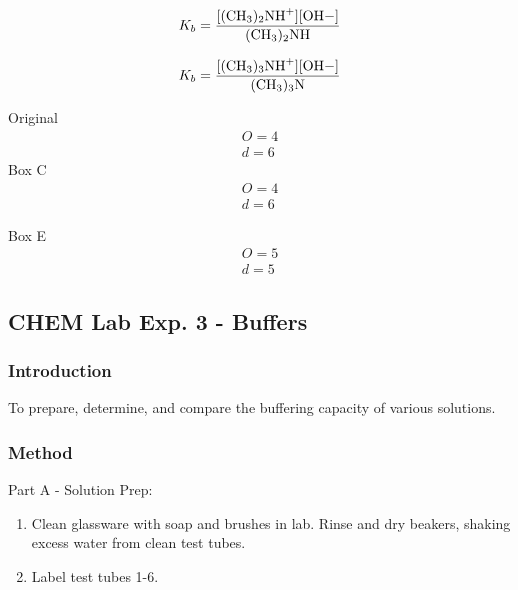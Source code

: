 \documentclass{article}  %
\begin{document}
\begin{equation*}
    \begin{aligned}
        K_b = \ce{\frac{[(CH3)2NH^+][OH-]}{(CH3)2NH}}
    \end{aligned}
\end{equation*}

\begin{equation*}
    \begin{aligned}
        K_b = \ce{\frac{[(CH3)3NH+][OH-]}{(CH3)3N}}
    \end{aligned}
\end{equation*}

Original
\begin{equation*}
    \begin{aligned}
        O = 4 \\
        d = 6 
    \end{aligned}
\end{equation*}
Box C
\begin{equation*}
    \begin{aligned}
        O = 4 \\
        d = 6 
    \end{aligned}
\end{equation*}

Box E
\begin{equation*}
    \begin{aligned}
        O = 5 \\
        d = 5 
    \end{aligned}
\end{equation*}

\subsection*{CHEM Lab Exp. 3 - Buffers}
\subsubsection*{Introduction} 
To prepare, determine, and compare the buffering capacity of various solutions.
\subsubsection*{Method}
Part A - Solution Prep:
\begin{enumerate}
    \item Clean glassware with soap and brushes in lab. Rinse and dry beakers, shaking excess water from clean test tubes.
    \item Label test tubes 1-6.
\end{enumerate}
\end{document}

